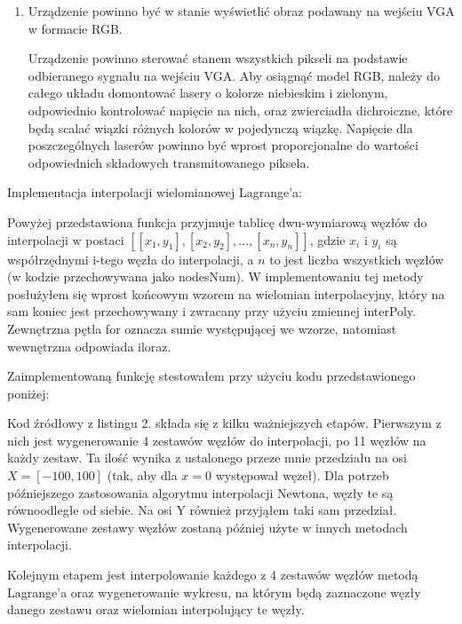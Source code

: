 \documentclass[a4paper,oneside,11pt]{report}
\begin{document}
\begin{enumerate}[1.]
\item Urządzenie powinno być w stanie wyświetlić obraz podawany na wejściu VGA w formacie RGB.

Urządzenie powinno sterować stanem wszystkich pikseli na podstawie odbieranego sygnału na wejściu VGA. Aby osiągnąć model RGB, należy do całego układu domontować lasery o kolorze niebieskim i zielonym, odpowiednio kontrolować napięcie na nich, oraz zwierciadła dichroiczne, które będą scalać wiązki różnych kolorów w pojedynczą wiązkę. Napięcie dla poszczególnych laserów powinno być wprost proporcjonalne do wartości odpowiednich składowych transmitowanego piksela. 

\end{enumerate}

Implementacja interpolacji wielomianowej Lagrange’a:


Powyżej przedstawiona funkcja przyjmuje tablicę dwu-wymiarową węzłów do interpolacji w postaci $[[x_1 , y_1 ], [x_2 , y_2 ], ..., [x_n , y_n ]]$, gdzie $x_i$ i $y_i$ są współrzędnymi i-tego węzła do interpolacji, a $n$ to jest liczba wszystkich węzłów (w kodzie przechowywana jako nodesNum). W implementowaniu tej metody posłużyłem się wprost końcowym wzorem na wielomian interpolacyjny, który na sam koniec jest przechowywany i zwracany przy użyciu zmiennej interPoly. Zewnętrzna pętla for oznacza sumie występującej we wzorze, natomiast wewnętrzna odpowiada iloraz.

Zaimplementowaną funkcję stestowałem przy użyciu kodu przedstawionego poniżej:


Kod źródłowy z listingu 2. składa się z kilku ważniejszych etapów. Pierwszym z nich jest
wygenerowanie 4 zestawów węzłów do interpolacji, po 11 węzłów na każdy zestaw. Ta ilość wynika z ustalonego przeze mnie przedziału na osi $X = [-100, 100]$ (tak, aby dla $x = 0$ występował węzeł). Dla potrzeb późniejszego zastosowania algorytmu interpolacji Newtona, węzły te są równoodległe od siebie. Na osi Y również przyjąłem taki sam przedział. Wygenerowane zestawy węzłów zostaną później użyte w innych metodach interpolacji.

Kolejnym etapem jest interpolowanie każdego z 4 zestawów węzłów metodą Lagrange’a oraz wygenerowanie wykresu, na którym będą zaznaczone węzły danego zestawu oraz wielomian interpolujący te węzły.
\end{document}
